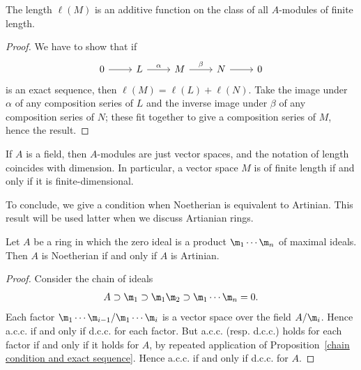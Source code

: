 \begin{proposition}\label{module length add}
The length $\ell(M)$ is an additive function on the class of all $A$-modules of finite length.
\end{proposition}
\begin{proof}
We have to show that if
\[\begin{tikzcd}
0\ar[r]&L\ar[r,"\alpha"]&M\ar[r,"\beta"]&N\ar[r]&0
\end{tikzcd}\] 
is an exact sequence, then $\ell(M)=\ell(L)+\ell(N)$. Take the image under $\alpha$ of any composition series of $L$ and the inverse image under $\beta$ of any composition series of $N$; these fit together to give a composition series of $M$, hence the result.
\end{proof}
\begin{example}
If $A$ is a field, then $A$-modules are just vector spaces, and the notation of length coincides with dimension. In particular, a vector space $M$ is of finite length if and only if it is finite-dimensional.
\end{example}
To conclude, we give a condition when Noetherian is equivalent to Artinian. This result will be used latter when we discuss Artianian rings.
\begin{corollary}\label{Noe iff Art if zero is product of maximal}
Let $A$ be a ring in which the zero ideal is a product $\m_1\cdots\m_n$ of maximal ideals. Then $A$ is Noetherian if and only if $A$ is Artinian.
\end{corollary}
\begin{proof}
Consider the chain of ideals 
\[A\supset \m_1\supset \m_1\m_2\supset\m_1\cdots\m_n=0.\] 
Each factor $\m_1\cdots\m_{i-1}/\m_1\cdots\m_i$ is a vector space over the field $A/\m_i$. Hence a.c.c. if and only if d.c.c. for each factor. But a.c.c. (resp. d.c.c.) holds for each factor if and only if it holds for $A$, by repeated application of Proposition~\ref{chain condition and exact sequence}. Hence a.c.c. if and only if d.c.c. for $A$.
\end{proof}
